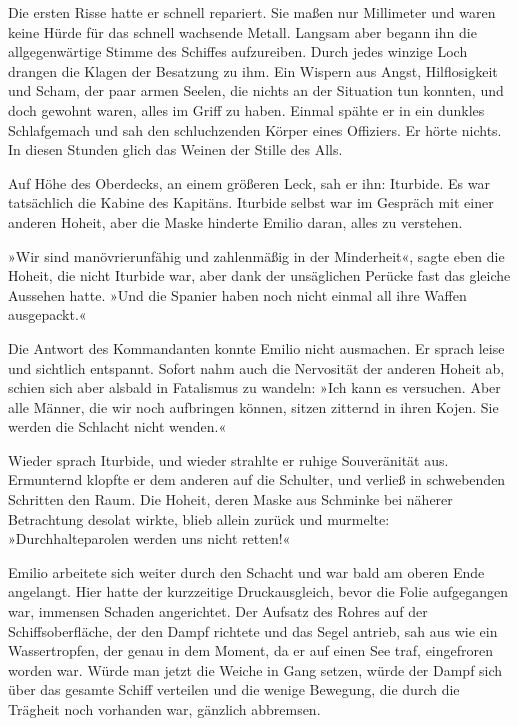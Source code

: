 Die ersten Risse hatte er schnell repariert. Sie maßen nur
Millimeter und waren keine Hürde für das schnell wachsende Metall.
Langsam aber begann ihn die allgegenwärtige Stimme des Schiffes
aufzureiben. Durch jedes winzige Loch drangen die Klagen der
Besatzung zu ihm. Ein Wispern aus Angst, Hilflosigkeit und Scham,
der paar armen Seelen, die nichts an der Situation tun konnten, und
doch gewohnt waren, alles im Griff zu haben. Einmal spähte er in
ein dunkles Schlafgemach und sah den schluchzenden Körper eines
Offiziers. Er hörte nichts. In diesen Stunden glich das Weinen der
Stille des Alls.

\bigpar

Auf Höhe des Oberdecks, an einem größeren Leck, sah er ihn:
Iturbide. Es war tatsächlich die Kabine des Kapitäns. Iturbide
selbst war im Gespräch mit einer anderen Hoheit, aber die Maske
hinderte Emilio daran, alles zu verstehen.

»Wir sind manövrierunfähig und zahlenmäßig in der Minderheit«,
sagte eben die Hoheit, die nicht Iturbide war, aber dank der
unsäglichen Perücke fast das gleiche Aussehen hatte. »Und die
Spanier haben noch nicht einmal all ihre Waffen ausgepackt.«

Die Antwort des Kommandanten konnte Emilio nicht ausmachen. Er
sprach leise und sichtlich entspannt. Sofort nahm auch die
Nervosität der anderen Hoheit ab, schien sich aber alsbald in
Fatalismus zu wandeln: »Ich kann es versuchen. Aber alle Männer,
die wir noch aufbringen können, sitzen zitternd in ihren Kojen. Sie
werden die Schlacht nicht wenden.«

Wieder sprach Iturbide, und wieder strahlte er ruhige Souveränität
aus. Ermunternd klopfte er dem anderen auf die Schulter, und
verließ in schwebenden Schritten den Raum. Die Hoheit, deren Maske
aus Schminke bei näherer Betrachtung desolat wirkte, blieb allein
zurück und murmelte: »Durchhalteparolen werden uns nicht retten!«

Emilio arbeitete sich weiter durch den Schacht und war bald am
oberen Ende angelangt. Hier hatte der kurzzeitige Druckausgleich,
bevor die Folie aufgegangen war, immensen Schaden angerichtet. Der
Aufsatz des Rohres auf der Schiffsoberfläche, der den Dampf
richtete und das Segel antrieb, sah aus wie ein Wassertropfen, der
genau in dem Moment, da er auf einen See traf, eingefroren worden
war. Würde man jetzt die Weiche in Gang setzen, würde der Dampf
sich über das gesamte Schiff verteilen und die wenige Bewegung, die
durch die Trägheit noch vorhanden war, gänzlich abbremsen.

